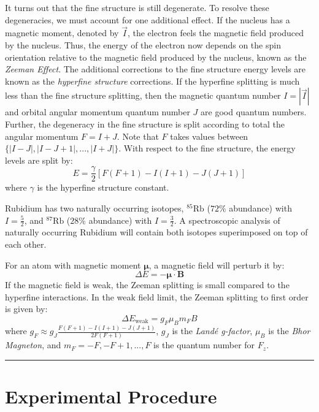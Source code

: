 \documentclass[12pt]{article}
\newcommand{\redmark}{\textcolor{myred1}{\rule{3.5mm}{3.5mm} }} %
\newcommand{\RbEF}{$^{85}\text{Rb}$ }
\newcommand{\RbES}{$^{87}\text{Rb}$ }
\begin{document}
	It turns out that the fine structure is still degenerate. To resolve these degeneracies, we must account for one additional effect. If the nucleus has a magnetic moment, denoted by $\vec{I}$, the electron feels the magnetic field produced by the nucleus. Thus, the energy of the electron now depends on the spin orientation relative to the magnetic field produced by the nucleus, known as the \emph{Zeeman Effect}. The additional corrections to the fine structure energy levels are known as the \emph{hyperfine structure} corrections. If the hyperfine splitting is much less than the fine structure splitting, then the magnetic quantum number $I=|\vec{I}|$ and orbital angular momentum quantum number $J$ are good quantum numbers. Further, the degeneracy in the fine structure is split according to total the angular momentum $F=I+J$. Note that $F$ takes values between $\{|I-J|, |I-J+1|,...,|I+J|\}$. With respect to the fine structure, the energy levels are split by:
	\begin{equation}
		\label{hyperfineSplitting}
		E = \frac{\gamma}{2}\left[ F(F+1) - I(I+1) - J(J+1) \right]
	\end{equation}
	where $\gamma$ is the hyperfine structure constant.
	
	Rubidium has two naturally occurring isotopes, \RbEF ($72\%$ abundance) with $I=\frac{5}{2}$, and \RbES ($28\%$ abundance) with $I=\frac{3}{2}$. A spectroscopic analysis of naturally occurring Rubidium will contain both isotopes superimposed on top of each other. 
	
	For an atom with magnetic moment $\bm{\mu}$, a magnetic field will perturb it by:
	\begin{equation}
		\Delta E = - \bm{\mu} \cdot \mathbf{B} 
	\end{equation}
	If the magnetic field is weak, the Zeeman splitting is small compared to the hyperfine interactions. In the weak field limit, the Zeeman splitting to first order is given by:
	\begin{equation}
		\Delta E_{\text{weak}} = g_F \mu_B m_F B
		\label{zeemanWeak}
	\end{equation}
	where $g_F \approx g_J \frac{F(F+1)-I(I+1)-J(J+1)}{2F(F+1)}$, $g_J$ is the \emph{Land\'e g-factor}, $\mu_B$ is the \emph{Bhor Magneton}, and $m_F=-F,-F+1,...,F$ is the quantum number for $F_z$. \redmark
		
	 
	\section{Experimental Procedure}
\end{document}
